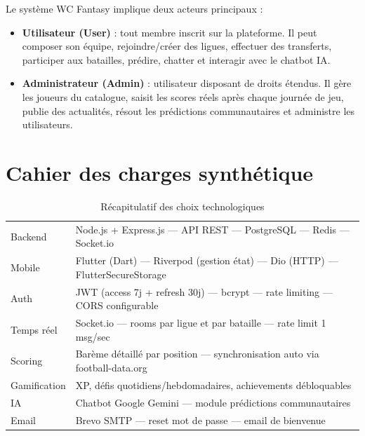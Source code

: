 Le système WC Fantasy implique deux acteurs principaux :

\begin{itemize}
    \item \textbf{Utilisateur (User)} : tout membre inscrit sur la plateforme. Il peut composer son équipe, rejoindre/créer des ligues, effectuer des transferts, participer aux batailles, prédire, chatter et interagir avec le chatbot IA.
    \item \textbf{Administrateur (Admin)} : utilisateur disposant de droits étendus. Il gère les joueurs du catalogue, saisit les scores réels après chaque journée de jeu, publie des actualités, résout les prédictions communautaires et administre les utilisateurs.
\end{itemize}

\section{Cahier des charges synthétique}

\vspace{0.3cm}

\begin{table}[!htbp]
\centering
    \begin{tabularx}{\linewidth}{|l|X|}
        \hline
        \rowcolor{emsigreen}\multicolumn{2}{|c|}{\textcolor{white}{\textbf{Récapitulatif des choix technologiques}}} \\
        \hline
        Backend & Node.js + Express.js --- API REST\cite{mdn_rest} --- PostgreSQL --- Redis --- Socket.io \\
        \hline
        Mobile & Flutter (Dart) --- Riverpod (gestion état) --- Dio (HTTP) --- FlutterSecureStorage \\
        \hline
        Auth & JWT (access 7j + refresh 30j) --- bcrypt --- rate limiting --- CORS configurable \\
        \hline
        Temps réel & Socket.io --- rooms par ligue et par bataille --- rate limit 1 msg/sec \\
        \hline
        Scoring & Barème détaillé par position --- synchronisation auto via football-data.org \\
        \hline
        Gamification & XP, défis quotidiens/hebdomadaires, achievements débloquables \\
        \hline
        IA & Chatbot Google Gemini --- module prédictions communautaires \\
        \hline
        Email & Brevo SMTP --- reset mot de passe --- email de bienvenue \\
        \hline
    \end{tabularx}
\caption{Récapitulatif des choix technologiques}
\end{table}

